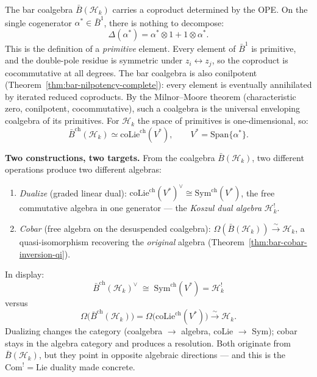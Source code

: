 The bar coalgebra $\bar{B}(\mathcal{H}_k)$ carries a coproduct
determined by the OPE.  On the single cogenerator
$\alpha^* \in \bar{B}^1$, there is nothing to decompose:
\begin{equation}\label{eq:frame-primitive}
\Delta(\alpha^*) = \alpha^* \otimes 1 + 1 \otimes \alpha^*.
\end{equation}
This is the definition of a \emph{primitive} element.
Every element of $\bar{B}^1$ is primitive, and the
double-pole residue is symmetric under $z_i \leftrightarrow z_j$,
so the coproduct is cocommutative at all degrees.
The bar coalgebra is also conilpotent
(Theorem~\ref{thm:bar-nilpotency-complete}): every element
is eventually annihilated by iterated reduced coproducts.
By the Milnor--Moore theorem
(characteristic zero, conilpotent, cocommutative), such a
coalgebra is the universal enveloping coalgebra of its
primitives.  For $\mathcal{H}_k$ the space of primitives is
one-dimensional, so:
\begin{equation}\label{eq:frame-bar-coalgebra}
\bar{B}^{\mathrm{ch}}(\mathcal{H}_k)
\simeq \mathrm{coLie}^{\mathrm{ch}}(V^*),
\qquad V^* = \mathrm{Span}\{\alpha^*\}.
\end{equation}

\medskip
\noindent\textbf{Two constructions, two targets.}
From the coalgebra $\bar{B}(\mathcal{H}_k)$, two different
operations produce two different algebras:
\begin{enumerate}
\item \emph{Dualize} (graded linear dual):
$\mathrm{coLie}^{\mathrm{ch}}(V^*)^\vee
\cong \mathrm{Sym}^{\mathrm{ch}}(V^*)$,
the free commutative algebra in one generator ---
the \emph{Koszul dual algebra} $\mathcal{H}_k^!$.
\item \emph{Cobar} (free algebra on the desuspended coalgebra):
$\Omega(\bar{B}(\mathcal{H}_k))
\xrightarrow{\sim} \mathcal{H}_k$,
a quasi-isomorphism recovering the \emph{original} algebra
(Theorem~\ref{thm:bar-cobar-inversion-qi}).
\end{enumerate}
In display:
\begin{equation}\label{eq:frame-koszul-dual-coalgebra-to-algebra}
\bar{B}^{\mathrm{ch}}(\mathcal{H}_k)^\vee
\;\cong\; \mathrm{Sym}^{\mathrm{ch}}(V^*)
= \mathcal{H}_k^!
\end{equation}
versus
\[
\Omega\bigl(\bar{B}^{\mathrm{ch}}(\mathcal{H}_k)\bigr)
= \Omega\bigl(\mathrm{coLie}^{\mathrm{ch}}(V^*)\bigr)
\xrightarrow{\;\sim\;} \mathcal{H}_k.
\]
Dualizing changes the category (coalgebra $\to$ algebra,
coLie $\to$ Sym); cobar stays in the algebra category and
produces a resolution.  Both originate from
$\bar{B}(\mathcal{H}_k)$, but they point in opposite
algebraic directions --- and this is the $\mathrm{Com}^!
= \mathrm{Lie}$ duality made concrete.

